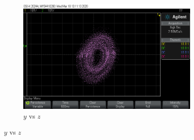 \documentclass[10pt]{beamer}
\begin{document}
\begin{frame}
\begin{figure}[!ht]
\begin{subfigure}[b]{0.3\textwidth}
	    \label{fig:Y4_X_vs_Z}
	  \end{subfigure}
	  \hfill
	  \begin{subfigure}[b]{0.3\textwidth}
	    \includegraphics[trim={6cm 2cm 9cm 2cm},clip,width=\textwidth]{../imagenes/Y6_Y_vs_Z.png}
	    \caption{$y$ vs $z$}
	    \label{Y6_Y_vs_Z}
	  \end{subfigure}
	\end{figure}
	\end{frame}	
\end{document}
